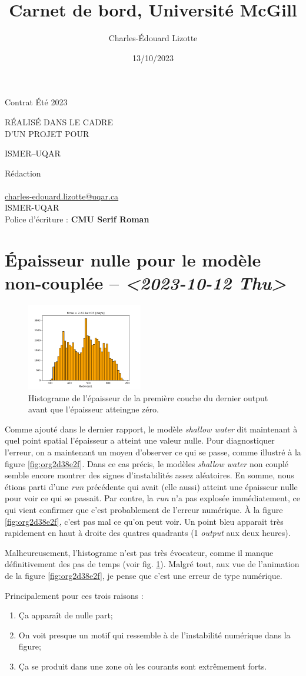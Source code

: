 \documentclass[10pt]{report}
\author{Charles-Édouard Lizotte}
\date{13/10/2023}
\title{Carnet de bord, Université McGill}
\makeatletter
\numberwithin{equation}{section}
\newcommand{\mytitlepage}{
\begin{titlepage}
\begin{center}
{\Huge Contrat Été 2023 \par}
\vspace{2cm}
{\Huge \MakeUppercase{\thetitle} \par}
\vspace{2cm}
RÉALISÉ DANS LE CADRE\\ D'UN PROJET POUR \par
\vspace{2cm}
{\Huge ISMER--UQAR \par}
\vspace{2cm}
{\thedate}
\end{center}
\vfill
Rédaction \\
{\theauthor}\\
\url{charles-edouard.lizotte@uqar.ca}\\
ISMER-UQAR\\
Police d'écriture : \textbf{CMU Serif Roman}
\end{titlepage}
}
\makeatother
\begin{document}
\mytitlepage
\tableofcontents\newpage

\section{Épaisseur nulle pour le modèle non-couplée -- \textit{<2023-10-12 Thu>}}
\label{sec:org383864e}

\begin{figure}\vspace{-\baselineskip} \centering
\centering
\includegraphics[width=0.45\textwidth]{figures/debuggage/2023_10_08_thickness1_histo.png}
\caption{\label{fig:orgb7c69ca}Histograme de l'épaisseur de la première couche du dernier output avant que l'épaisseur atteingne zéro.}
\end{figure}


Comme ajouté dans le dernier rapport, le modèle \emph{shallow water} dit maintenant à quel point spatial l'épaisseur a atteint une valeur nulle.
Pour diagnostiquer l'erreur, on a maintenant un moyen d'observer ce qui se passe, comme illustré à la figure \ref{fig:org2d38e2f}.
Dans ce cas précis, le modèles \emph{shallow water} non couplé semble encore montrer des signes d'instabilités assez aléatoires.
En somme, nous étions parti d'une \emph{run} précédente qui avait (elle aussi) atteint une épaisseur nulle pour voir ce qui se passait.
Par contre, la \emph{run} n'a pas explosée immédiatement, ce qui vient confirmer que c'est probablement de l'erreur numérique.
À la figure \ref{fig:org2d38e2f}, c'est pas mal ce qu'on peut voir.
Un point bleu apparait très rapidement en haut à droite des quatres quadrants (1 \emph{output} aux deux heures). \bigskip

Malheureusement, l'histograme n'est pas très évocateur, comme il manque définitivement des pas de temps (voir fig. \ref{fig:orgb7c69ca}).
Malgré tout, aux vue de l'animation de la figure \ref{fig:org2d38e2f}, je pense que c'est une erreur de type numérique.\bigskip

Principalement pour ces trois raisons : 
\begin{enumerate}
\item Ça apparaît de nulle part;
\item On voit presque un motif qui ressemble à de l'instabilité numérique dans la figure;
\item Ça se produit dans une zone où les courants sont extrêmement forts.
\end{enumerate}
\end{document}
